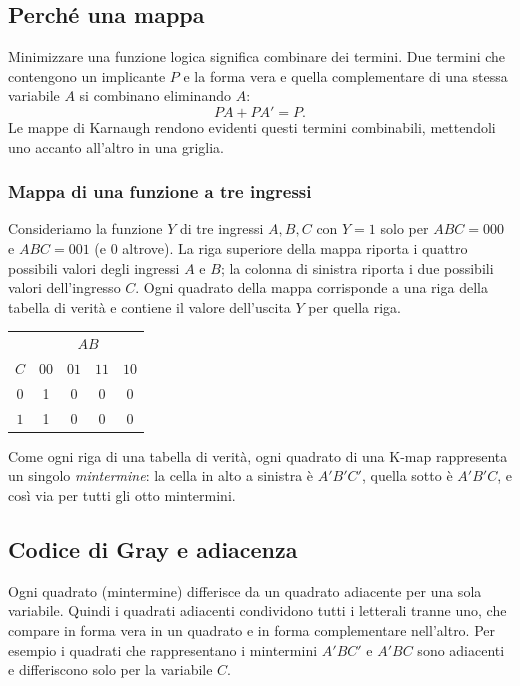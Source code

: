 \documentclass[11pt,a4paper]{article}
\begin{document}
\subsection{Perché una mappa}

Minimizzare una funzione logica significa combinare dei termini. Due termini che contengono un implicante $P$ e la forma vera e quella complementare di una stessa variabile $A$ si combinano eliminando $A$:
\[
PA + PA' = P.
\]
Le mappe di Karnaugh rendono evidenti questi termini combinabili, mettendoli uno accanto all'altro in una griglia.

\subsubsection{Mappa di una funzione a tre ingressi}

Consideriamo la funzione $Y$ di tre ingressi $A, B, C$ con $Y = 1$ solo per $ABC = 000$ e $ABC = 001$ (e $0$ altrove). La riga superiore della mappa riporta i quattro possibili valori degli ingressi $A$ e $B$; la colonna di sinistra riporta i due possibili valori dell'ingresso $C$. Ogni quadrato della mappa corrisponde a una riga della tabella di verità e contiene il valore dell'uscita $Y$ per quella riga.

\begin{center}
\begin{tabular}{c|cccc}
 & \multicolumn{4}{c}{$AB$}\\
$C$ & $00$ & $01$ & $11$ & $10$ \\
\midrule
$0$ & 1 & 0 & 0 & 0 \\
$1$ & 1 & 0 & 0 & 0 \\
\end{tabular}
\end{center}

Come ogni riga di una tabella di verità, ogni quadrato di una K-map rappresenta un singolo \emph{mintermine}: la cella in alto a sinistra è $A'B'C'$, quella sotto è $A'B'C$, e così via per tutti gli otto mintermini.

\subsection{Codice di Gray e adiacenza}

Ogni quadrato (mintermine) differisce da un quadrato adiacente per una sola variabile. Quindi i quadrati adiacenti condividono tutti i letterali tranne uno, che compare in forma vera in un quadrato e in forma complementare nell'altro. Per esempio i quadrati che rappresentano i mintermini $A'BC'$ e $A'BC$ sono adiacenti e differiscono solo per la variabile $C$.
\end{document}
